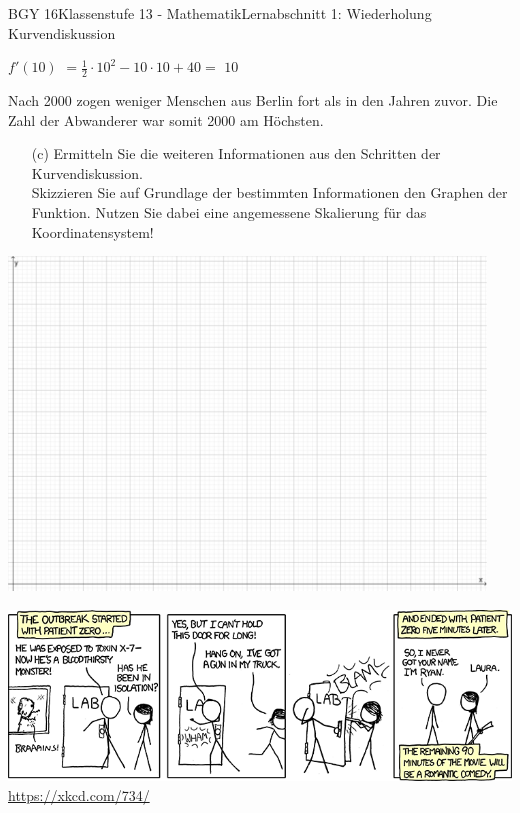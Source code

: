 \documentclass[oneside,openany,headings=optiontotoc,11pt,numbers=noenddot]{scrreprt}
\begin{document}
\begin{worksheet}{BGY 16}{Klassenstufe 13 - Mathematik}{Lernabschnitt 1: Wiederholung Kurvendiskussion}
\begin{framed}
			\colorbox{green!10}{\(f'(10)\)} \(= \frac{1}{2}\cdot{}10^2 -10\cdot{}10 +40 =\) \colorbox{green!10}{\(10\)}\\
			\par\bigskip\noindent
			Nach 2000 zogen weniger Menschen aus Berlin fort als in den Jahren zuvor. Die Zahl der \grqq{}Abwanderer\grqq{} war somit 2000 am Höchsten.
		\end{framed}
		\begin{itemize}
			\item[(c)] Ermitteln Sie die weiteren Informationen aus den Schritten der Kurvendiskussion.\\
			Skizzieren Sie auf Grundlage der bestimmten Informationen den Graphen der Funktion. Nutzen Sie dabei eine angemessene Skalierung für das Koordinatensystem!
		\end{itemize}
		\begin{center}
			\includegraphics[width=0.95\textwidth]{../99_Bilder/00_Wdh/KoordLeer.png}
		\end{center}
		\newpage
		\includegraphics[width=\textwidth]{../99_Bilder/outbreak.png}\\
		\tiny{\color{codegray}\href{https://xkcd.com/734/}{https://xkcd.com/734/}}
		\normalsize
		\begin{framed}

\end{framed}
\end{worksheet}
\end{document}
